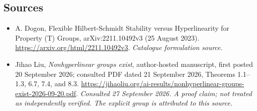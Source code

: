 \documentclass[11pt,a4paper]{article}
\numberwithin{equation}{section}
\begin{document}
\subsection{Sources}
\begin{itemize}\raggedright
\item[\textnormal{[S1]}]\hypertarget{source:statement:1}{} A. Dogon, Flexible Hilbert-Schmidt Stability versus Hyperlinearity for Property (T) Groups, arXiv:2211.10492v3 (25 August 2023).
\url{https://arxiv.org/html/2211.10492v3}.
{\small\textit{Catalogue formulation source.}}
\item[\textnormal{[E1]}]\hypertarget{extra:statement:1}{} Jihao Liu,
\emph{Nonhyperlinear groups exist}, author-hosted manuscript, first posted
20 September 2026; consulted PDF dated 21 September 2026, Theorems 1.1--1.3, 6.7, 7.4, and 8.3.
\url{https://jihaoliu.org/ai-results/nonhyperlinear-groups-exist-2026-09-20.pdf}.
{\small\textit{Consulted 27 September 2026. A proof claim; not treated as
independently verified. The explicit group is attributed to this source.}}
\end{itemize}
\end{document}
